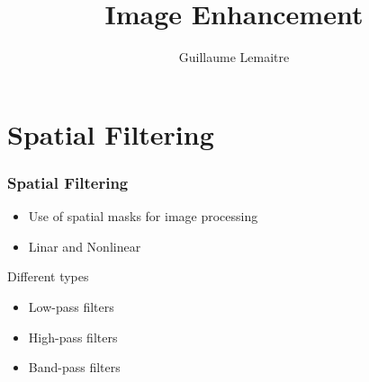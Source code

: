 \documentclass{beamer}
\title{Image Enhancement}
\author{Guillaume Lemaitre}
\institute{Universit\'e de Bourgogne}
\begin{document}
\begin{frame}
  \titlepage
\end{frame}

\begin{frame}
  \tableofcontents[sectionstyle=show,subsectionstyle=show,subsubsectionstyle=hide]
\end{frame}

\section{Spatial Filtering}
\begin{frame}
\frametitle{Spatial Filtering}
\begin{itemize}
	\item Use of spatial masks for image processing 
	\item Linar and Nonlinear 
\end{itemize}
\begin{block}{Different types}
	\begin{itemize}
	\item Low-pass filters 
	\item High-pass filters 
	\item Band-pass filters
	\end{itemize}
\end{block}
\end{frame}
\end{document}
